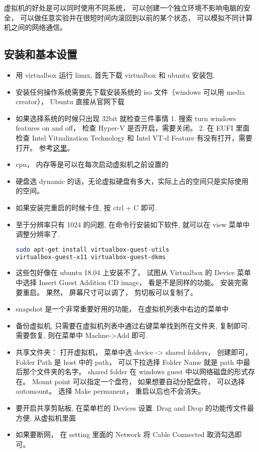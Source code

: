 
\begin{issues}
\issueDraft
\end{issues}

虚拟机的好处是可以同时使用不同系统， 可以创建一个独立环境不影响电脑的安全， 可以做任意实验并在很短时间内滚回到以前的某个状态， 可以模拟不同计算机之间的网络通信。

\subsection{安装和基本设置}

\begin{itemize}
\item 用 virtualbox 运行 linux, 首先下载 virtualbox 和 ubuntu 安装包.
\item 安装任何操作系统需要先下载安装系统的 iso 文件（windows 可以用 media creator）， Ubuntu 直接从官网下载
\item 如果选择系统的时候只出现 32bit 就检查三件事情 1. 搜索 turn windows features on and off， 检查 Hyper-V 是否开启，需要关闭。 2. 在 EUFI 里面检查 Intel Vitualization Technology 和 Intel VT-d Feature 有没有打开，需要打开。 参考\href{http://www.fixedbyvonnie.com/2014/11/virtualbox-showing-32-bit-guest-versions-64-bit-host-os/}{这里}。
\item cpu， 内存等是可以在每次启动虚拟机之前设置的
\item 硬盘选 dynamic 的话，无论虚拟硬盘有多大，实际上占的空间只是实际使用的空间。
\item 如果安装完重启的时候卡住, 按 ctrl + C 即可.
\item 至于分辨率只有 1024 的问题, 在命令行安装如下软件, 就可以在 view 菜单中调整分辨率了.
\begin{lstlisting}[language=bash]
sudo apt-get install virtualbox-guest-utils
virtualbox-guest-x11 virtualbox-guest-dkms
\end{lstlisting}
\item 这些包好像在 ubuntu 18.04 上安装不了， 试图从 Virtualbox 的 Device 菜单中选择 Insert Guest Addition CD image， 看是不是同样的功能。 安装完需要重启。 果然， 屏幕尺寸可以调了， 剪切板可以复制了。
\item snapshot 是一个非常重要好用的功能， 在虚拟机列表中右边的菜单中
\item 备份虚拟机, 只需要在虚拟机列表中通过右键菜单找到所在文件夹, 复制即可. 需要恢复, 则在菜单中 Machne->Add 即可.
\item 共享文件夹： 打开虚拟机， 菜单中选 device -> shared folders， 创建即可， Folder Path 是 host 中的 path， 可以下拉选择 Folder Name 就是 path 中最后那个文件夹的名字。 shared folder 在 windows guest 中以网络磁盘的形式存在。 Mount point 可以指定一个盘符， 如果想要自动分配盘符， 可以选择 automount。 选择 Make permanent， 重启以后也不会消失。
\item 要开启共享剪贴板, 在菜单栏的 Devices 设置. Drag and Drop 的功能传文件最方便. 从虚拟机里面
\item 如果要断网， 在 setting 里面的 Network 将 Cable Connected 取消勾选即可。
\end{itemize}

